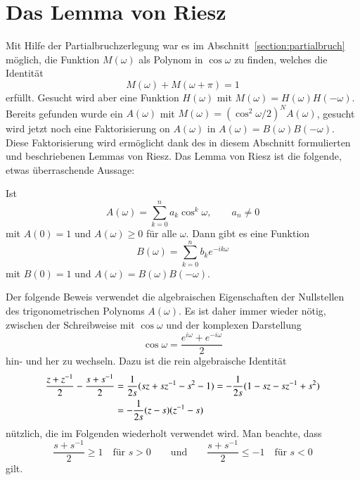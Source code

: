 %
%
%

%
%
\section{Das Lemma von Riesz\label{section:riesz}}
%
%
Mit Hilfe der Partialbruchzerlegung war es im
Abschnitt~\ref{section:partialbruch}
möglich, die Funktion $M(\omega)$ als Polynom in $\cos\omega$ zu finden,
welches die Identität
\[
M(\omega) + M(\omega + \pi) = 1
\]
erfüllt.
Gesucht wird aber eine Funktion $H(\omega)$ mit
$M(\omega)=H(\omega)H(-\omega)$.
Bereits gefunden wurde ein $A(\omega)$ mit
$M(\omega)=(\cos^2\omega/2)^N A(\omega)$, gesucht wird jetzt noch 
eine Faktorisierung on $A(\omega)$ in $A(\omega)=B(\omega)B(-\omega)$.
Diese Faktorisierung wird ermöglicht dank des in diesem Abschnitt
formulierten und beschriebenen Lemmas von Riesz.
Das Lemma von Riesz ist die folgende, etwas überraschende Aussage:


\begin{lemma}[Riesz]
\label{lemma:riesz}
Ist
\[
A(\omega)
=
\sum_{k=0}^n
a_k \cos^k \omega,
\qquad
a_n\ne 0
\]
mit $A(0)=1$ und $A(\omega)\ge 0$ für alle $\omega$.
Dann gibt es eine Funktion
\[
B(\omega)
=
\sum_{k=0}^n b_ke^{-ik\omega}
\]
mit $B(0)=1$ und $A(\omega)=B(\omega)B(-\omega)$.
\end{lemma}

Der folgende Beweis verwendet die algebraischen Eigenschaften der
Nullstellen des trigonometrischen Polynoms $A(\omega)$.
Es ist daher immer wieder nötig, zwischen der Schreibweise mit
$\cos\omega$ und der komplexen Darstellung
\[
\cos\omega = \frac{e^{i\omega}+e^{-i\omega}}{2}
\]
hin- und her zu wechseln.
Dazu ist die rein algebraische Identität
\begin{align}
\frac{z+z^{-1}}2-\frac{s+s^{-1}}2
&=
\frac1{2s}(sz+sz^{-1}-s^2-1)
=
-
\frac1{2s}(1-sz-sz^{-1}+s^2)
\notag
\\
&=
-
\frac1{2s}(z-s)(z^{-1}-s)
\label{buch:kompakt:cosh}
\end{align}
nützlich, die im Folgenden wiederholt verwendet wird.
Man beachte, dass 
\[
\frac{s+s^{-1}}2
\ge 1\quad\text{für $s>0$}
\qquad\text{und}\qquad
\frac{s+s^{-1}}2
\le -1\quad\text{für $s<0$}
\]
gilt.


